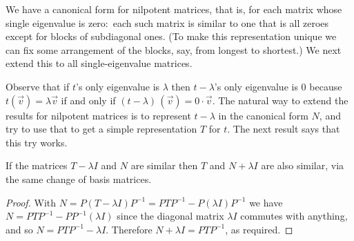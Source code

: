 We have a canonical form for nilpotent matrices, 
that is, for each matrix whose single eigenvalue is zero:~each 
such matrix is similar to one that is all
zeroes except for blocks of subdiagonal ones.
(To make this representation unique we can fix some arrangement of
the blocks, say, from longest to shortest.)
We next extend this to all single-eigenvalue matrices.

Observe that if \( t \)'s only eigenvalue is \( \lambda \) then 
\( t-\lambda \)'s only eigenvalue is \( 0 \) because
\( t(\vec{v})=\lambda\vec{v} \) if and 
only if \( (t-\lambda)\,(\vec{v})=0\cdot\vec{v} \).
The natural way to extend the results for nilpotent matrices is to
represent $t-\lambda$ in the canonical form $N$, and try to use that
to get a simple representation $T$ for $t$.  
The next result says that this try works.

\begin{lemma}   \label{le:SimRespAddScalar}
If the matrices \( T-\lambda I \) and \( N \) are similar 
then \( T \) and \( N+\lambda I \) are also similar,
via the same change of basis matrices.
\end{lemma}

\begin{proof}
With \( N=P(T-\lambda I)P^{-1}=PTP^{-1}-P(\lambda I)P^{-1} \)
we have $N=PTP^{-1}-PP^{-1}(\lambda I)$
since the diagonal matrix \( \lambda I \) commutes with anything, 
and so \( N=PTP^{-1}-\lambda I \).
Therefore \( N+\lambda I=PTP^{-1} \), as required.
\end{proof}

